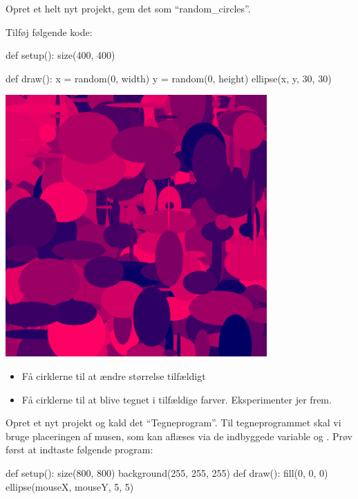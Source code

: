 \documentclass{ucph-handout}
\begin{document}
\newpage
\begin{exercisebox}[adjusted title=Tilfældighed]
\begin{minipage}{0.65\linewidth}
Opret et helt nyt projekt, gem det som ``random\_circles''.
  
Tilføj følgende kode:
\begin{python}
def setup():
    size(400, 400)

def draw():
    x = random(0, width)
    y = random(0, height)
    ellipse(x, y, 30, 30)
\end{python}
\end{minipage}
\begin{minipage}{0.34\linewidth}
\begin{center}
\includegraphics[width=0.75\textwidth]{../illustrations/images/randomcircles.png}
\end{center}
\end{minipage}
\vspace{-2mm}
\begin{itemize}
\item Få cirklerne til at ændre størrelse tilfældigt
\item Få cirklerne til at blive tegnet i tilfældige
  farver. Eksperimenter jer frem.
\end{itemize}
\vspace{-4mm}
\end{exercisebox}

\begin{exercisebox}[adjusted title=Input fra musen]
\vspace{-2mm}
Opret et nyt projekt og kald det ``Tegneprogram''. Til tegneprogrammet
skal vi bruge placeringen af musen, som kan aflæses via de indbyggede variable
 og . Prøv først at indtaste følgende program:
\begin{python}
def setup():
    size(800, 800)
    background(255, 255, 255)
def draw():
    fill(0, 0, 0)
    ellipse(mouseX, mouseY, 5, 5)
  \end{python}
  \vspace{-4mm}
\end{exercisebox}
\end{document}
